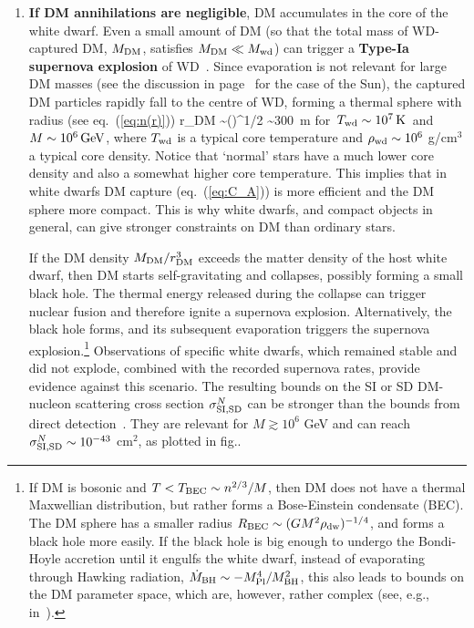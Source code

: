 \begin{enumerate}
 \item {\bf If DM annihilations are negligible}, 
DM accumulates in the core of the white dwarf. Even a small amount of DM
(so that the total mass of WD-captured DM, $M_{\rm DM}$, satisfies   $M_{\rm DM}\ll M_{\rm wd}$)
can trigger a {\bf Type-Ia supernova explosion} of WD~\cite{aDMinWD}. 
Since evaporation is not relevant for large DM masses (see the discussion in page~\pageref{vescSun} for the case of the Sun), the captured DM particles rapidly fall to the centre of WD, forming a thermal sphere with radius (see eq.~(\ref{eq:n(r)}))
\beq r_{\rm DM} \sim \left(\right)^{1/2} \sim 300\, {\rm m}\qquad
\hbox{for $T_{\rm wd} \sim 10^7\,{\rm K}$ and $M\sim 10^6\GeV$,}\label{eq:RDMwd}\eeq
where $T_{\rm wd}$ is a typical core temperature and $\rho_{\rm wd} \sim 10^6$ g/cm$^3$ a typical core density.
Notice that `normal' stars have a much 
lower core density and also a somewhat higher core temperature. This implies that in white dwarfs DM capture (eq.~(\ref{eq:C_A})) is more efficient and the DM sphere more compact.
This is why white dwarfs, and compact objects in general, can give stronger constraints on DM than ordinary stars.


If the DM density $M_{\rm DM}/r_{\rm DM}^3$ exceeds the matter density of the host white dwarf, 
then DM starts self-gravitating and collapses, possibly forming a small black hole.
The thermal energy released during the collapse can trigger nuclear fusion and therefore ignite a supernova explosion. Alternatively, the black hole forms, and its subsequent evaporation triggers the supernova explosion.\footnote{If DM is bosonic and $ T < T_{\rm BEC} \sim n^{2/3}/M$, then DM does not have 
a thermal Maxwellian distribution, but rather
forms a Bose-Einstein condensate (BEC). The DM sphere 
has a smaller radius
$R_{\rm BEC} \sim (G M^2 \rho_{\rm dw})^{-1/4}$,
and forms a black hole more easily.
If the black hole is big enough to undergo the Bondi-Hoyle accretion
until it engulfs the white dwarf, instead of evaporating through Hawking radiation, 
$\dot M_{\rm BH} \sim -M_{\rm Pl}^4/M_{\rm BH}^2$, this also leads to bounds on the DM parameter space, which are, however, rather complex (see, e.g.,~ in~\cite{aDMinWD}).} 
Observations of specific white dwarfs, which remained stable and did not explode, combined with the recorded supernova rates, provide evidence against this scenario. The
 resulting bounds on the SI or SD DM-nucleon scattering cross section $\sigma_{\rm SI,SD}^{N}$
can be stronger than the bounds from direct detection~\cite{aDMinWD}. 
They are relevant for $M \gtrsim 10^6$ GeV and can reach $\sigma_{\rm SI,SD}^{N} \sim 10^{-43}$ cm$^2$,
as plotted in fig..
\end{enumerate}



